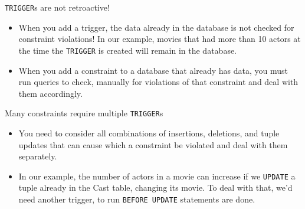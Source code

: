 \documentclass[xcolor={usenames,dvipsnames}]{beamer}
\begin{document}


\begin{frame}[fragile]

\lstinline[style=SQL]{TRIGGER}s \alert{are not retroactive}!

\begin{itemize}[-]
\item When you add a trigger, the data already in the database is not checked for constraint violations! In our example, movies that had more than 10 actors at the time the \lstinline[style=SQL]{TRIGGER} is created will remain in the database.

\item When you add a constraint to a database that already has data, you must run queries to check, manually for violations of that constraint and deal with them accordingly.
\end{itemize}

\end{frame}


\begin{frame}[fragile]

\alert{Many constraints require multiple} \lstinline[style=SQL]{TRIGGER}s

\begin{itemize}[-]
\item You need to consider all combinations of insertions, deletions, and tuple updates that can cause which a constraint be violated and deal with them separately.

\item In our example, the number of actors in a movie can increase if we \lstinline[style=SQL]{UPDATE} a tuple already in the Cast table, changing its movie. To deal with that, we'd need another trigger, to run \lstinline[style=SQL]{BEFORE UPDATE} statements are done.
\end{itemize}


\end{frame}
\end{document}
